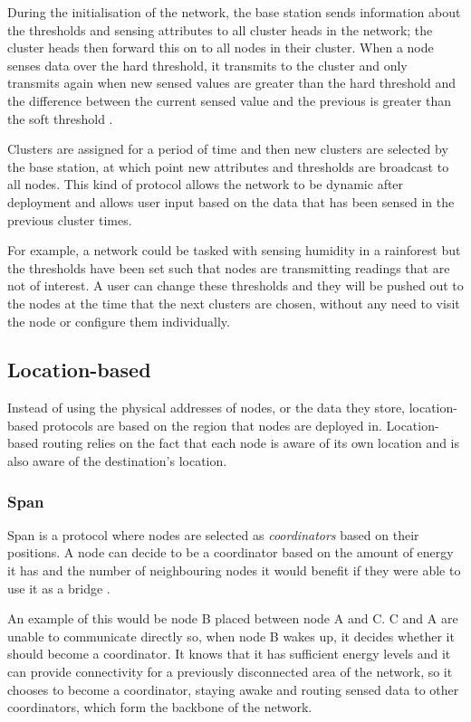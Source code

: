 During the initialisation of the network, the base station sends information about the thresholds and sensing attributes to all cluster heads in the network; the cluster heads then forward this on to all nodes in their cluster.  When a node senses data over the hard threshold, it transmits to the cluster and only transmits again when new sensed values are greater than the hard threshold and the difference between the current sensed value and the previous is greater than the soft threshold \cite{Manjeshwar2001}.

Clusters are assigned for a period of time and then new clusters are selected by the base station, at which point new attributes and thresholds are broadcast to all nodes. This kind of protocol allows the network to be dynamic after deployment and allows user input based on the data that has been sensed in the previous cluster times. 

For example, a network could be tasked with sensing humidity in a rainforest but the thresholds have been set such that nodes are transmitting readings that are not of interest. A user can change these thresholds and they will be pushed out to the nodes at the time that the next clusters are chosen, without any need to visit the node or configure them individually.

\subsection{Location-based}
	Instead of using the physical addresses of nodes, or the data they store, location-based protocols are based on the region that nodes are deployed in. Location-based routing relies on the fact that each node is aware of its own location and is also aware of the destination's location.

\subsubsection{Span}
	Span is a protocol where nodes are selected as \textit{coordinators} based on their positions. A node can decide to be a coordinator based on the amount of energy it has and the number of neighbouring nodes it would benefit if they were able to use it as a bridge \cite{Chen2002}.

An example of this would be node B placed between node A and C. C and A are unable to communicate directly so, when node B wakes up, it decides whether it should become a coordinator. It knows that it has sufficient energy levels and it can provide connectivity for a previously disconnected area of the network, so it chooses to become a coordinator, staying awake and routing sensed data to other coordinators, which form the backbone of the network.

